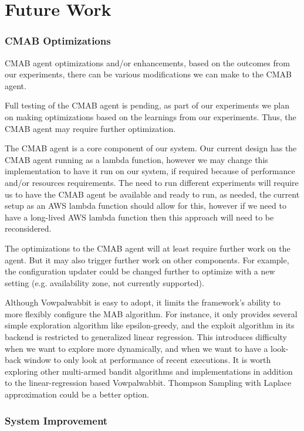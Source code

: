 \documentclass[conference]{IEEEtran}
\begin{document}
\section{Future Work}

\subsubsection{CMAB Optimizations}

CMAB agent optimizations and/or enhancements, based on the outcomes from our experiments, there can be various modifications we can make to the CMAB agent.

Full testing of the CMAB agent is pending, as part of our experiments we plan on making optimizations based on the learnings from our experiments. Thus, the CMAB agent may require further optimization.

The CMAB agent is a core component of our system. Our current design has the CMAB agent running as a lambda function, however we may change this implementation to have it run on our system, if required because of performance and/or resources requirements. The need to run different experiments will require us to have the CMAB agent be available and ready to run, as needed, the current setup as an AWS lambda function should allow for this, however if we need to have a long-lived AWS lambda function then this approach will need to be reconsidered.

The optimizations to the CMAB agent will at least require further work on the agent. But it may also trigger further work on other components. For example, the configuration updater could be changed further to optimize with a new setting (e.g. availability zone, not currently supported).

Although Vowpalwabbit is easy to adopt, it limits the framework's ability to more flexibly configure the MAB algorithm. For instance, it only provides several simple exploration algorithm like epsilon-greedy, and the exploit algorithm in its backend is restricted to generalized linear regression. This introduces difficulty when we want to explore more dynamically, and when we want to have a look-back window to only look at performance of recent executions. It is worth exploring other multi-armed bandit algorithms and implementations in addition to the linear-regression based Vowpalwabbit. Thompson Sampling with Laplace approximation could be a better option.

\subsubsection{System Improvement}
\end{document}
